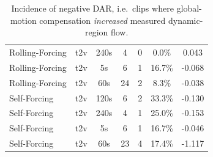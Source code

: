 \begin{table}[tb]
\begin{tabular}{lcccccc}
Rolling-Forcing & t2v & 240s & 4 & 0 & 0.0\% & 0.043 \\
Rolling-Forcing & t2v & 5s & 6 & 1 & 16.7\% & -0.068 \\
Rolling-Forcing & t2v & 60s & 24 & 2 & 8.3\% & -0.038 \\
Self-Forcing & t2v & 120s & 6 & 2 & 33.3\% & -0.130 \\
Self-Forcing & t2v & 240s & 4 & 1 & 25.0\% & -0.153 \\
Self-Forcing & t2v & 5s & 6 & 1 & 16.7\% & -0.046 \\
Self-Forcing & t2v & 60s & 23 & 4 & 17.4\% & -1.117 \\
\bottomrule
\end{tabular}
\caption{Incidence of negative DAR, i.e.\ clips where global-motion compensation \emph{increased} measured dynamic-region flow.}
\label{tab:darneg}
\end{table}